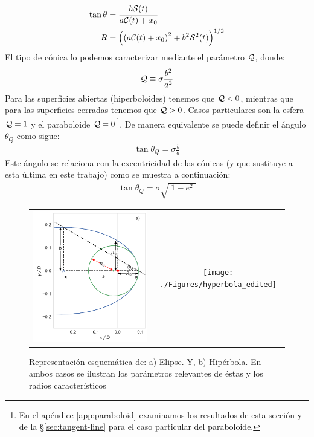 \begin{align}
  \tan\theta &= \frac{b\mathcal{S}(t)}{a\mathcal{C}(t) + x_0} \label{eq:t-th-conversion} \\
  R &= \left(\left(a\mathcal{C}(t) + x_0\right)^2 + b^2\mathcal{S}^2(t)\right)^{1/2} 
\end{align}
El tipo de cónica lo podemos caracterizar mediante el parámetro $\mathcal{Q}$, donde:
\begin{align}
  \mathcal{Q} \equiv \sigma\frac{b^2}{a^2} \label{eq:conic-parameter-a-b}
\end{align}
Para las superficies abiertas (hiperboloides) tenemos que $\mathcal{Q} < 0$, mientras que para las superficies cerradas tenemos que $\mathcal{Q} > 0$. Casos particulares son la esfera $\mathcal{Q} = 1$ y el paraboloide $\mathcal{Q} = 0$\footnote{En el apéndice \ref{app:paraboloid} examinamos los resultados de esta sección y de la \S \ref{sec:tangent-line} para el caso particular del paraboloide.}. De manera equivalente se puede definir el ángulo $\theta_Q$ como sigue:
\begin{align}
  \tan\theta_Q = \sigma \frac{b}{a} \label{eq:thc}
\end{align}
Este ángulo se relaciona con la excentricidad de las cónicas (y que sustituye a esta última en este trabajo) como se muestra a continuación:
\begin{align}
  \tan\theta_Q = \sigma\sqrt{\left|1-e^2\right|}
\end{align}
\begin{figure}
  \centering
  \begin{tabular}{cc}
    \includegraphics[width=0.4\linewidth]{./Figures/ellipse_edited} &
    \texttt{[image: ./Figures/hyperbola\_edited]}
  \end{tabular}
  \caption[Parámetros relevantes y radios característicos de elipse e hipérbola]{Representación esquemática de: a) Elipse. Y, b) Hipérbola. En ambos casos se ilustran los parámetros relevantes de éstas y los radios característicos}
  \label{fig:conics}
\end{figure}

